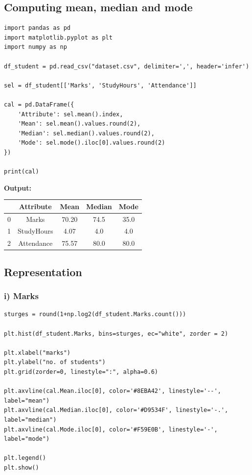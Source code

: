 
\subsection{Computing mean, median and mode}

\begin{lstlisting}[style=python]
import pandas as pd 
import matplotlib.pyplot as plt 
import numpy as np

df_student = pd.read_csv("dataset.csv", delimiter=',', header='infer')

sel = df_student[['Marks', 'StudyHours', 'Attendance']]

cal = pd.DataFrame({
    'Attribute': sel.mean().index,
    'Mean': sel.mean().values.round(2),
    'Median': sel.median().values.round(2),
    'Mode': sel.mode().iloc[0].values.round(2)
})

print(cal)
\end{lstlisting}

\textbf{Output:}

\begin{tabular}{ccccc}
    \toprule
    & \textbf{Attribute} & \textbf{Mean} & \textbf{Median} & \textbf{Mode} \\
    \midrule
    0 & Marks  & 70.20 & 74.5 & 35.0 \\
    1 & StudyHours  & 4.07 & 4.0 & 4.0 \\
    2 & Attendance  & 75.57 & 80.0 & 80.0 \\
    \bottomrule
\end{tabular}


\subsection{Representation}

\subsubsection*{i) Marks}

\begin{lstlisting}[style=python]
sturges = round(1+np.log2(df_student.Marks.count()))

plt.hist(df_student.Marks, bins=sturges, ec="white", zorder = 2)

plt.xlabel("marks")
plt.ylabel("no. of students")
plt.grid(zorder=0, linestyle=":", alpha=0.6)

plt.axvline(cal.Mean.iloc[0], color='#8EBA42', linestyle='--', label="mean")
plt.axvline(cal.Median.iloc[0], color='#D9534F', linestyle='-.', label="median")
plt.axvline(cal.Mode.iloc[0], color='#F59E0B', linestyle='-', label="mode")

plt.legend()
plt.show()

\end{lstlisting}

